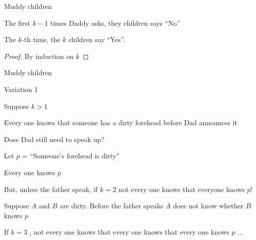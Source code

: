 \begin{frame}{Muddy children}
\begin{theorem}
\BI
\item The first $k-1$ times Daddy asks, they children says “No”
\item The $k$-th time, the $k$ children say “Yes”.
\EI
\end{theorem}

\begin{proof}
By induction on $k$
\end{proof}


\end{frame}

\begin{frame}{Muddy children}
\begin{block}{Variation 1}
\BI
\item Suppose $k>1$
\item Every one knows that someone has a dirty forehead before Dad announces it
\item Does Dad still need to speak up?
\EI
\end{block}

\pause
\BI
\item Let $p$ = “Someone’s forehead is dirty” 
\item Every one knows $p$
\item But, unless the father speak, if $k = 2$ not every one knows that everyone knows $p$!
\item Suppose $A$ and $B$ are dirty. Before the father speaks $A$ does not know whether $B$ knows $p$
\item If $k = 3$ , not every one knows that every one knows that every one knows $p$ ...
\EI


\end{frame}

